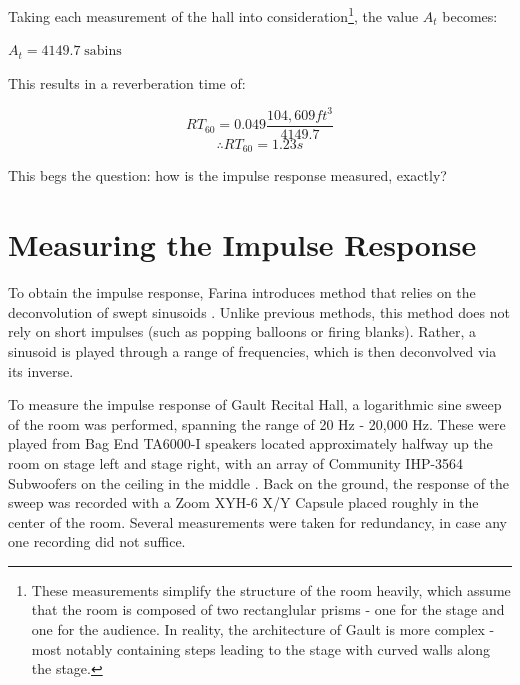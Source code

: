 Taking each measurement of the hall into consideration\footnote{These measurements simplify the structure of the room heavily, which assume that the room is composed of two rectanglular prisms - one for the stage and one for the audience. In reality, the architecture of Gault is more complex - most notably containing steps leading to the stage with curved walls along the stage.}, the value $A_t$ becomes:
\begin{center}
\end{center}
\begin{center}
  $A_t = 4149.7 \; \text{sabins}$
\end{center}

This results in a reverberation time of:

\begin{equation}
 RT_{60} = 0.049 \frac{104,609 ft^3}{4149.7}
\end{equation}
\begin{equation}
 \therefore RT_{60} = 1.23s
\end{equation}

This begs the question: how is the impulse response measured, exactly?

\section{Measuring the Impulse Response}
To obtain the impulse response, Farina introduces method that relies on the deconvolution of swept sinusoids \cite{farina2000simultaneous}. Unlike previous methods, this method does not rely on short impulses (such as popping balloons or firing blanks). Rather, a sinusoid is played through a range of frequencies, which is then deconvolved via its inverse.

To measure the impulse response of Gault Recital Hall, a logarithmic sine sweep of the room was performed, spanning the range of 20 Hz - 20,000 Hz. These were played from Bag End TA6000-I speakers located approximately halfway up the room on stage left and stage right, with an array of Community IHP-3564 Subwoofers on the ceiling in the middle \cite{woosound}. Back on the ground, the response of the sweep was recorded with a Zoom XYH-6 X/Y Capsule placed roughly in the center of the room. Several measurements were taken for redundancy, in case any one recording did not suffice.

